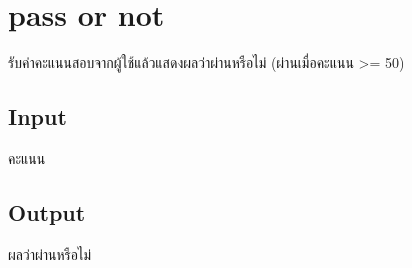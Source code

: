 \documentclass{article}
\begin{document}
\section*{pass or not}

รับค่าคะแนนสอบจากผู้ใช้แล้วแสดงผลว่าผ่านหรือไม่ (ผ่านเมื่อคะแนน \textgreater= 50)\\



\subsection*{Input}
คะแนน



\subsection*{Output}
{ผลว่าผ่านหรือไม่}\\
\end{document}
